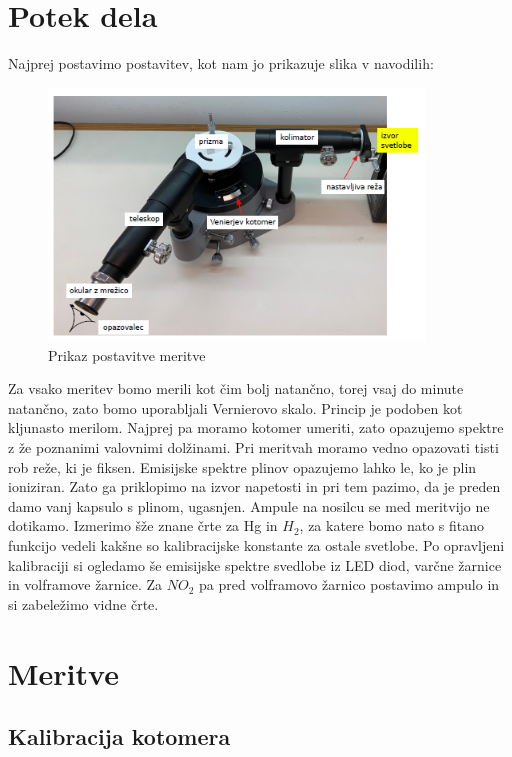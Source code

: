 \documentclass[11pt, a4paper]{article}
\theoremstyle{definition}
\theoremstyle{example}
\theoremstyle{izrek}
\begin{document}
\section{Potek dela}
Najprej postavimo postavitev, kot nam jo prikazuje slika v navodilih:
\begin{figure}[H]
    \centering
    \includegraphics[width=10cm]{Postavitev.png}
    \caption{Prikaz postavitve meritve}
\end{figure}
Za vsako meritev bomo merili kot čim bolj natančno, torej vsaj do minute natančno, zato bomo uporabljali Vernierovo skalo. Princip je podoben kot kljunasto merilom. Najprej pa moramo kotomer umeriti, zato opazujemo spektre z že poznanimi valovnimi dolžinami. Pri meritvah moramo vedno opazovati tisti rob reže, ki je fiksen. Emisijske spektre plinov opazujemo lahko le, ko je plin ioniziran. Zato ga priklopimo na izvor napetosti in pri tem pazimo, da je preden damo vanj kapsulo s plinom, ugasnjen. Ampule na nosilcu se med meritvijo ne dotikamo. 
Izmerimo šže znane črte za Hg in $H_2$, za katere bomo nato s fitano funkcijo vedeli kakšne so kalibracijske konstante za ostale svetlobe. Po opravljeni kalibraciji si ogledamo še emisijske spektre svedlobe iz LED diod, varčne žarnice in volframove žarnice. Za $NO_2$ pa pred volframovo žarnico postavimo ampulo in si zabeležimo vidne črte.

\section{Meritve}
\subsection{Kalibracija kotomera}
\end{document}
